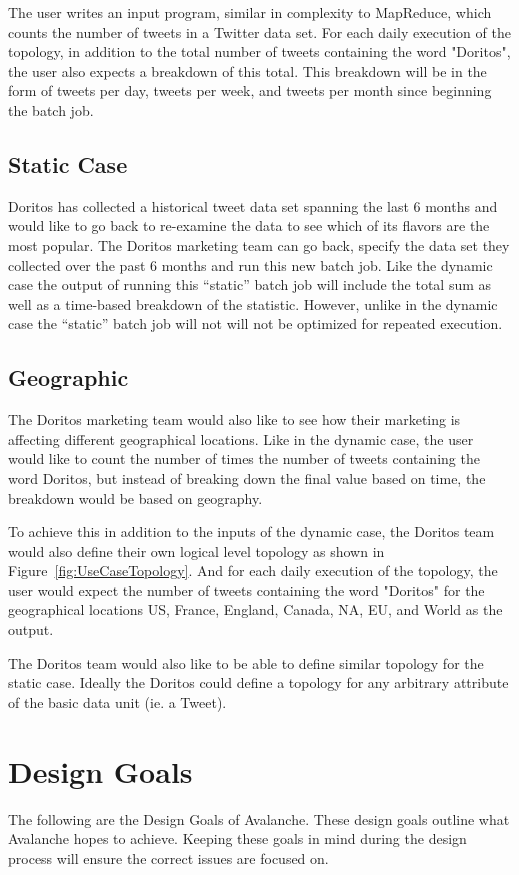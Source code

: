 \documentclass[a4paper]{article}
\begin{document}
The user writes an input program, similar in complexity to MapReduce, which counts the number of tweets in a Twitter data set.  For each daily execution of the topology, in addition to the total number of tweets containing the word "Doritos", the user also expects a breakdown of this total.  This breakdown will be in the form of tweets per day, tweets per week, and tweets per month since beginning the batch job.  

\subsection{Static Case}
Doritos has collected a historical tweet data set spanning the last 6 months and would like to go back to re-examine the data to see which of its flavors are the most popular.  The Doritos marketing team can go back, specify the data set they collected over the past 6 months and run this new batch job.  Like the dynamic case the output of running this “static” batch job will include the total sum as well as a time-based breakdown of the statistic.   However, unlike in the dynamic case the “static” batch job will not will not be optimized for repeated execution.  

\subsection{Geographic}
The Doritos marketing team would also like to see how their marketing is affecting different geographical locations.  Like in the dynamic case, the user would like to count the number of times the number of tweets containing the word Doritos, but instead of breaking down the final value based on time, the breakdown would be based on geography.  

To achieve this in addition to the inputs of the dynamic case, the Doritos team would also define their own logical level topology as shown in Figure~\ref{fig:UseCaseTopology}.  And for each daily execution of the topology, the user would expect the number of tweets containing the word "Doritos" for the geographical locations US, France, England, Canada, NA, EU, and World as the output.  

The Doritos team would also like to be able to define similar topology for the static case.  Ideally the Doritos could define a topology for any arbitrary attribute of the basic data unit (ie. a Tweet).  

\section{Design Goals}
The following are the Design Goals of Avalanche.  These design goals outline what Avalanche hopes to achieve.  Keeping these goals in mind during the design process will ensure the correct issues are focused on.  
\end{document}
